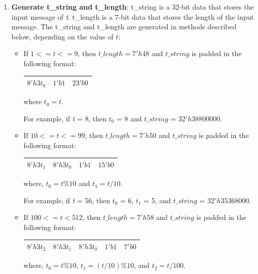 \documentclass[main\_\_EN.tex]{subfiles}
\begin{document}
\begin{enumerate}\label{sha-512/t}
    \item \textbf{Generate t\_string and t\_length}: t\_string is a 32-bit data that stores the input message of {\it{t}}. t\_length is a 7-bit data that stores the length of the input message. The t\_string and t\_length are generated in methods described below, depending on the value of \begin{math}t\end{math}:

    \begin{itemize}
        \item If $1<=t<=9$, then $t\_length=7'h48$ and $t\_string$ is padded in the following format:\\
        \begin{longtable}[c]{|p{2cm}|p{1cm}|p{3cm}|}
        \hline
        $8'h3t_0$ & $1'b1$ & $23'b0$\\
        \hline
        \end{longtable}
        where $t_0=t$.

        For example, if {\it{t}} = 8, then $t_0$ = 8 and $t\_string$ = $32'h38800000$.

        \item If $10<=t<=99$, then $t\_length=7'h50$ and $t\_string$ is padded in the following format:\\

        \begin{longtable}[c]{|p{1.5cm}|p{1.5cm}|p{1cm}|p{2.5cm}|}
        \hline
        $8'h3t_1$ & $8'h3t_0$ & $1'b1$ & $15'b0$\\
        \hline
        \end{longtable}
        where, $t_0=t\%10$ and $t_1=t/10$.

        For example, if {\it{t}} = 56, then $t_0$ = 6, $t_1$ = 5, and $t\_string$ = $32'h35368000$.

        \item If $100<=t<512$, then $t\_length=7'h58$ and $t\_string$ is padded in the following format:\\

        \begin{longtable}[c]{|p{1.5cm}|p{1.5cm}|p{1.5cm}|p{1cm}|p{1.5cm}|}
        \hline
        $8'h3t_2$ & $8'h3t_1$ & $8'h3t_0$ & $1'b1$ & $7'b0$\\
        \hline
        \end{longtable}
        where, $t_0=t\%10$, $t_1=(t/10)\%10$, and $t_2=t/100$.


\end{itemize}
\end{enumerate}
\end{document}
